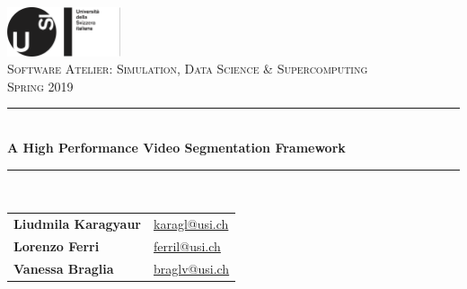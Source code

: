\documentclass[11pt]{article}
\begin{document}
\begin{titlepage}

\newcommand{\HRule}{\rule{\linewidth}{0.5mm}} %
 
\center 
\newcommand*{\plogo}{\includegraphics[width=0.25\textwidth]{./img/logo.png}}

\plogo \\[1.5 cm] %

\textsc{\Large Software Atelier: Simulation, Data Science \& Supercomputing}\\[0.5cm] %
\textsc{\large Spring 2019 }\\[0.5cm] %


\HRule \\[1cm]
{ \huge \bfseries A High Performance Video Segmentation Framework }\\[0.4cm] %
\HRule \\[2.0cm]
 



\begin{table}[h]
\centering
\begin{tabular}{l l}
\textbf{Liudmila Karagyaur} & {\href{mailto:karagl@usi.ch}{karagl@usi.ch}} \\
\textbf{Lorenzo Ferri} & {\href{mailto:ferril@usi.ch}{ferril@usi.ch}} \\
\textbf{Vanessa Braglia} & {\href{mailto:braglv@usi.ch}{braglv@usi.ch}} \\
\end{tabular}
\end{table}




\end{titlepage}
\end{document}
